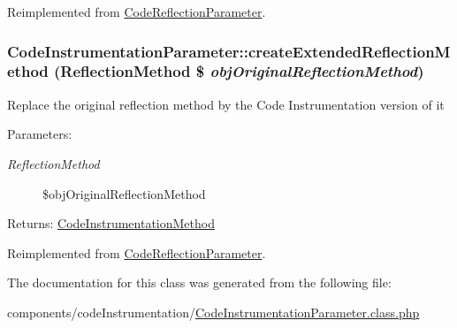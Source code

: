 Reimplemented from \hyperlink{class_code_reflection_parameter_5e6e7a1f49ff1f404342a2b2d4a15aa3}{CodeReflectionParameter}.\hypertarget{class_code_instrumentation_parameter_e0c68e69aa93979e2e1fa3057bd39d5a}{
\subsubsection[{createExtendedReflectionMethod}]{\setlength{\rightskip}{0pt plus 5cm}CodeInstrumentationParameter::createExtendedReflectionMethod (ReflectionMethod \$ {\em objOriginalReflectionMethod})}}
\label{class_code_instrumentation_parameter_e0c68e69aa93979e2e1fa3057bd39d5a}


Replace the original reflection method by the Code Instrumentation version of it

\begin{Desc}
\item[Parameters:]
\begin{description}
\item[{\em ReflectionMethod}]\$objOriginalReflectionMethod \end{description}
\end{Desc}
\begin{Desc}
\item[Returns:]\hyperlink{class_code_instrumentation_method}{CodeInstrumentationMethod} \end{Desc}


Reimplemented from \hyperlink{class_code_reflection_parameter_04d7dbd71bc943f3e267869a79bec648}{CodeReflectionParameter}.

The documentation for this class was generated from the following file:\begin{CompactItemize}
\item 
components/codeInstrumentation/\hyperlink{_code_instrumentation_parameter_8class_8php}{CodeInstrumentationParameter.class.php}\end{CompactItemize}
